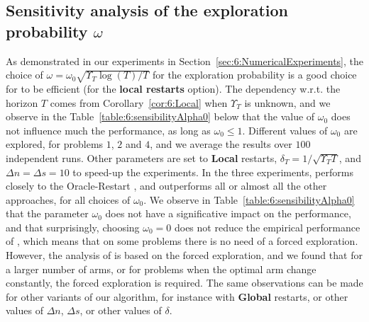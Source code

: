 \subsection{Sensitivity analysis of the exploration probability $\omega$}\label{sec:6:choosingAlpha0}

As demonstrated in our experiments in Section~\ref{sec:6:NumericalExperiments},
the choice of $\omega=\omega_0\sqrt{\Upsilon_T\log(T)/T}$ for the exploration probability is a good choice for \GLRklUCB{} to be efficient (for the \textbf{local restarts} option).
The dependency w.r.t. the horizon $T$ comes from Corollary~\ref{cor:6:Local} when $\Upsilon_T$ is unknown, and we observe in the Table~\ref{table:6:sensibilityAlpha0} below that the value of $\omega_0$ does not influence much the performance, as long as $\omega_0\leq1$.
Different values of $\omega_0$ are explored, for problems $1$, $2$ and $4$, and we average the results over $100$ independent runs.
Other parameters are set to \textbf{Local} restarts, $\delta_T=1/\sqrt{\Upsilon_T T}$, and $\Delta n = \Delta s = 10$ to speed-up the experiments.
%
In the three experiments, \GLRklUCB{} performs closely to the Oracle-Restart \klUCB{}, and outperforms all or almost all the other approaches, for all choices of $\omega_0$.
We observe in Table~\ref{table:6:sensibilityAlpha0} that the parameter $\omega_0$ does not have a significative impact on the performance,
and that surprisingly, choosing $\omega_0 = 0$ does not reduce the empirical performance of \GLRklUCB, which means that on some problems there is no need of a forced exploration.
However, the analysis of \GLRklUCB{} is based on the forced exploration, and we found that for a larger number of arms, or for problems when the optimal arm change constantly, the forced exploration is required.
%
The same observations can be made for other variants of our algorithm, for instance with \textbf{Global} restarts, or other values of $\Delta n$, $\Delta s$, or other values of $\delta$.

